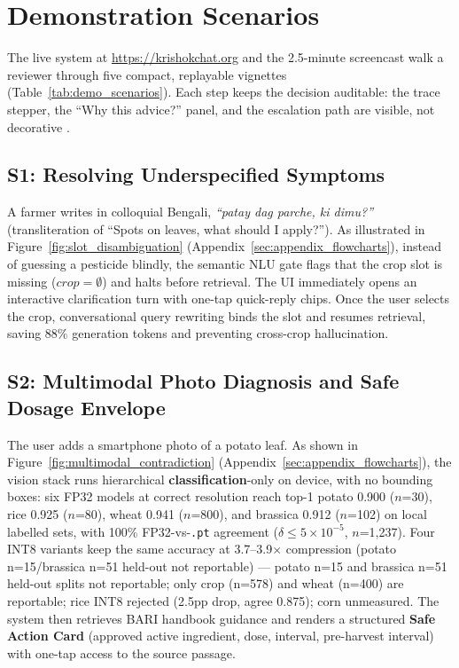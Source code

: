 \section{Demonstration Scenarios}
\label{sec:demonstration_scenarios}

The live system at \url{https://krishokchat.org} and the 2.5-minute screencast walk a reviewer through five compact, replayable vignettes (Table~\ref{tab:demo_scenarios}). Each step keeps the decision auditable: the trace stepper, the ``Why this advice?'' panel, and the escalation path are visible, not decorative \citep{ragvue2025}.



\subsection{S1: Resolving Underspecified Symptoms}
A farmer writes in colloquial Bengali, \textit{``patay dag parche, ki dimu?''} (transliteration of ``Spots on leaves, what should I apply?''). As illustrated in Figure~\ref{fig:slot_disambiguation} (Appendix~\ref{sec:appendix_flowcharts}), instead of guessing a pesticide blindly, the semantic NLU gate flags that the crop slot is missing ($crop=\emptyset$) and halts before retrieval. The UI immediately opens an interactive clarification turn with one-tap quick-reply chips. Once the user selects the crop, conversational query rewriting binds the slot and resumes retrieval, saving $88\%$ generation tokens and preventing cross-crop hallucination.

\subsection{S2: Multimodal Photo Diagnosis and Safe Dosage Envelope}
The user adds a smartphone photo of a potato leaf. As shown in Figure~\ref{fig:multimodal_contradiction} (Appendix~\ref{sec:appendix_flowcharts}), the vision stack runs hierarchical \textbf{classification}-only on device, with no bounding boxes: six FP32 models at correct resolution reach top-1 potato 0.900 ($n$=30), rice 0.925 ($n$=80), wheat 0.941 ($n$=800), and brassica 0.912 ($n$=102) on local labelled sets, with 100\% FP32-vs-{\tt .pt} agreement ($\delta\le5{\times}10^{-5}$, $n$=1,237). Four INT8 variants keep the same accuracy at 3.7--3.9$\times$ compression (potato n=15/brassica n=51 held-out not reportable) --- potato n=15 and brassica n=51 held-out splits not reportable; only crop (n=578) and wheat (n=400) are reportable; rice INT8 rejected (2.5pp drop, agree 0.875); corn unmeasured. The system then retrieves BARI handbook guidance and renders a structured \textbf{Safe Action Card} (approved active ingredient, dose, interval, pre-harvest interval) with one-tap access to the source passage.

